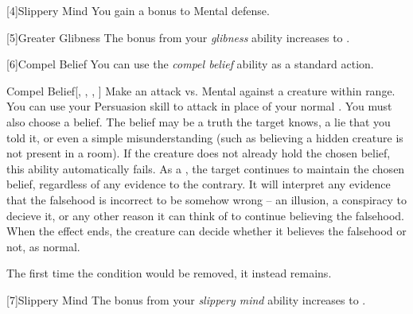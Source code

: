         [4]{Slippery Mind} You gain a  bonus to Mental defense.

        [5]{Greater Glibness} The bonus from your \textit{glibness} ability increases to .

        [6]{Compel Belief} You can use the \textit{compel belief} ability as a standard action.
        \begin{freeability}{Compel Belief}[, , , ]
            Make an attack vs. Mental against a creature within \rngmed range.
            You can use your Persuasion skill to attack in place of your normal .
            You must also choose a belief.
            The belief may be a truth the target knows, a lie that you told it, or even a simple misunderstanding (such as believing a hidden creature is not present in a room).
            If the creature does not already hold the chosen belief, this ability automatically fails.
            \hit As a , the target continues to maintain the chosen belief, regardless of any evidence to the contrary.
            It will interpret any evidence that the falsehood is incorrect to be somehow wrong -- an illusion, a conspiracy to decieve it, or any other reason it can think of to continue believing the falsehood.
            When the effect ends, the creature can decide whether it believes the falsehood or not, as normal.

            \rankline
             The first time the condition would be removed, it instead remains.
        \end{freeability}

        [7]{Slippery Mind} The bonus from your \textit{slippery mind} ability increases to .



